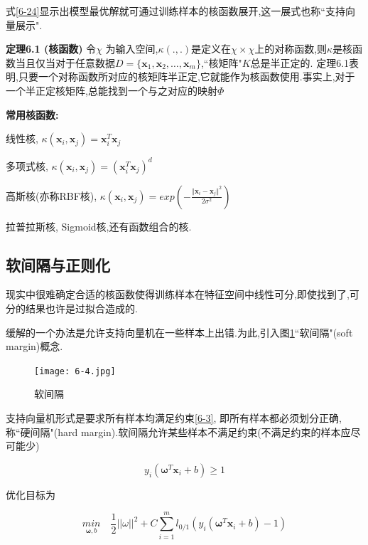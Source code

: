\documentclass[12pt]{article}
\numberwithin{equation}{section}%
\begin{document}
式\ref{6-24}显示出模型最优解就可通过训练样本的核函数展开,这一展式也称``支持向量展示".

\textbf{定理6.1 (核函数)}  \quad 令$\chi$ 为输入空间,$\kappa(.,.)$是定义在$\chi \times \chi$上的对称函数,则$\kappa$是核函数当且仅当对于任意数据$D=\{\boldsymbol{x}_{1},\boldsymbol{x}_{2},\ldots,\boldsymbol{x}_{m}\}$,``核矩阵"$K$总是半正定的.
 定理6.1表明,只要一个对称函数所对应的核矩阵半正定,它就能作为核函数使用.事实上,对于一个半正定核矩阵,总能找到一个与之对应的映射$\Phi$

\textbf{常用核函数:} 

线性核, \quad $ \kappa(\boldsymbol{x}_{i},\boldsymbol{x}_{j}) =  \boldsymbol{x}_{i}^{T}\boldsymbol{x}_{j}$

多项式核, \quad $ \kappa(\boldsymbol{x}_{i},\boldsymbol{x}_{j}) =  (\boldsymbol{x}_{i}^{T}\boldsymbol{x}_{j})^{d}$

高斯核(亦称RBF核),  \quad $\kappa(\boldsymbol{x}_{i},\boldsymbol{x}_{j}) =  exp(-\frac{\Vert \boldsymbol{x}_{i} - \boldsymbol{x}_{j}\Vert^{2}}{2\sigma ^{2}}) $

拉普拉斯核,  Sigmoid核,还有函数组合的核.

\subsection{软间隔与正则化}

现实中很难确定合适的核函数使得训练样本在特征空间中线性可分,即使找到了,可分的结果也许是过拟合造成的.

缓解的一个办法是允许支持向量机在一些样本上出错.为此,引入图\ref{6.4}``软间隔"(soft margin)概念.

\begin{figure}
\centering\texttt{[image: 6-4.jpg]}
\caption{软间隔}
\label{6.4}
\end{figure}

支持向量机形式是要求所有样本均满足约束\ref{6-3}, 即所有样本都必须划分正确,称``硬间隔"(hard margin).软间隔允许某些样本不满足约束(不满足约束的样本应尽可能少)

\begin{equation}
y_{i}(\boldsymbol{\omega}^{T}\boldsymbol{x}_{i}+b) \geqslant 1
\label{6-28}
\end{equation}

优化目标为

\begin{equation}
{\underset{\boldsymbol{\omega},b}{min}} \quad \dfrac{1}{2}||\omega||^{2}+C\sum_{i=1}^{m}l_{0/1}(y_{i}(\boldsymbol{\omega}^{T}\boldsymbol{x}_{i}+b)-1)
\label{6-29}
\end{equation}
\end{document}
